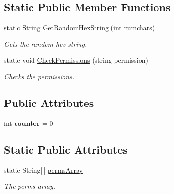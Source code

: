 \subsection*{Static Public Member Functions}
\begin{DoxyCompactItemize}
\item 
static String \hyperlink{classcom_1_1shephertz_1_1app42_1_1paas_1_1sdk_1_1csharp_1_1social_1_1_facebook_service_a6c613c4a8674d437840e5616b4a4dea3}{Get\+Random\+Hex\+String} (int numchars)
\begin{DoxyCompactList}\small\item\em Gets the random hex string. \end{DoxyCompactList}\item 
static void \hyperlink{classcom_1_1shephertz_1_1app42_1_1paas_1_1sdk_1_1csharp_1_1social_1_1_facebook_service_a962584cbe4111248d435c57bab324bb3}{Check\+Permissions} (string permission)
\begin{DoxyCompactList}\small\item\em Checks the permissions. \end{DoxyCompactList}\end{DoxyCompactItemize}
\subsection*{Public Attributes}
\begin{DoxyCompactItemize}
\item 
\hypertarget{classcom_1_1shephertz_1_1app42_1_1paas_1_1sdk_1_1csharp_1_1social_1_1_facebook_service_a7981b865021ec04d0f9aa554b195c98c}{int {\bfseries counter} = 0}\label{classcom_1_1shephertz_1_1app42_1_1paas_1_1sdk_1_1csharp_1_1social_1_1_facebook_service_a7981b865021ec04d0f9aa554b195c98c}

\end{DoxyCompactItemize}
\subsection*{Static Public Attributes}
\begin{DoxyCompactItemize}
\item 
static String\mbox{[}$\,$\mbox{]} \hyperlink{classcom_1_1shephertz_1_1app42_1_1paas_1_1sdk_1_1csharp_1_1social_1_1_facebook_service_ad8e49c202177d2d0bf46d1e6c486862b}{perms\+Array}
\begin{DoxyCompactList}\small\item\em The perms array. \end{DoxyCompactList}\end{DoxyCompactItemize}


